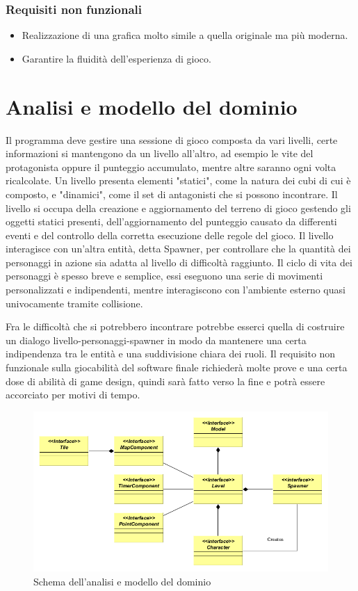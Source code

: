 \documentclass[a4paper,12pt, hidelinks]{report}
\begin{document}
\subsubsection{Requisiti non funzionali}
\begin{itemize}
	\item Realizzazione di una grafica molto simile a quella originale ma più moderna.
	\item Garantire la fluidità dell’esperienza di gioco.

\end{itemize}

\section{Analisi e modello del dominio}

Il programma deve gestire una sessione di gioco composta da vari livelli, certe informazioni si mantengono da un livello all'altro, ad esempio le vite del protagonista oppure il punteggio accumulato, mentre altre saranno ogni volta ricalcolate. Un livello presenta elementi "statici", come la natura dei cubi di cui è composto, e "dinamici", come il set di antagonisti che si possono incontrare. Il livello si occupa della creazione e aggiornamento del terreno di gioco gestendo gli oggetti statici presenti,  dell'aggiornamento del punteggio causato da differenti eventi e del controllo della corretta esecuzione delle regole del gioco. Il livello interagisce con un'altra entità, detta Spawner, per controllare che la quantità dei personaggi in azione sia adatta al livello di difficoltà raggiunto. Il ciclo di vita dei personaggi è spesso breve e semplice, essi eseguono una serie di movimenti personalizzati e indipendenti, mentre interagiscono con l'ambiente esterno quasi univocamente tramite collisione.

Fra le difficoltà che si potrebbero incontrare potrebbe esserci quella di costruire un dialogo livello-personaggi-spawner in modo da mantenere una certa indipendenza tra le entità e una suddivisione chiara dei ruoli. Il requisito non funzionale sulla giocabilità del software finale richiederà molte prove e una certa dose di abilità di game design, quindi sarà fatto verso la fine e potrà essere accorciato per motivi di tempo.

\begin{figure}[H]
\centering{}
\includegraphics[width=\linewidth]{img/Analisi}
\caption{Schema dell'analisi e modello del dominio}
\label{img:Analysis}
\end{figure}
\end{document}
